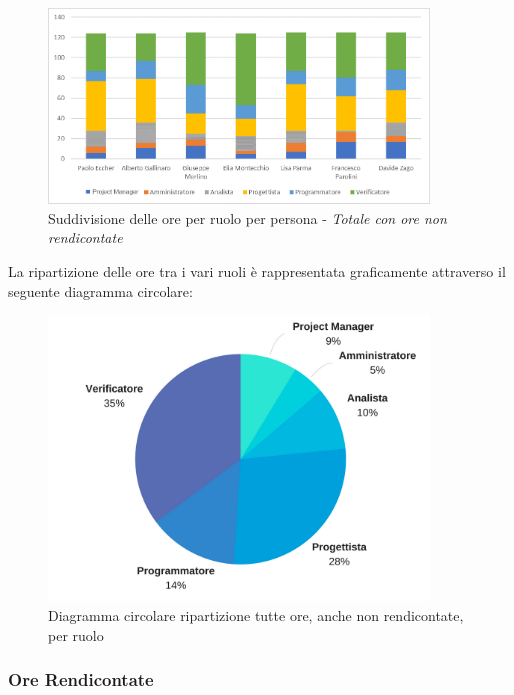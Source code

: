 			\begin{figure}[H] 
				\centering 
				\includegraphics[width=0.9\textwidth]{images/BarreTotale.png} 
				\caption{Suddivisione delle ore per ruolo per persona - \textit{Totale con ore non rendicontate}}
				\label{BarreTotale}
			\end{figure}

			
			La ripartizione delle ore tra i vari ruoli è rappresentata graficamente 
			attraverso il seguente diagramma circolare:
			
			\begin{figure}[H] 
				\centering 
				\includegraphics[width=0.9\textwidth]{images/CircolareTotale.png} 
				\caption{Diagramma circolare ripartizione tutte ore, anche non rendicontate, per ruolo}
				\label{CircolareTotale}
			\end{figure}
			
			\subsubsection{Ore Rendicontate}
			
